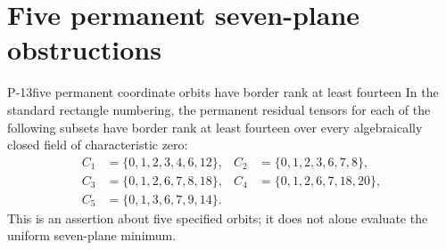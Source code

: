 \section{Five permanent seven-plane obstructions}

\begin{finding}{P-13}{five permanent coordinate orbits have border rank at least fourteen}
In the standard rectangle numbering, the permanent residual tensors
for each of the following subsets have border rank at least fourteen
over every algebraically closed field of characteristic zero:
\[
\begin{aligned}
 C_1&=\{0,1,2,3,4,6,12\},&
 C_2&=\{0,1,2,3,6,7,8\},\\
 C_3&=\{0,1,2,6,7,8,18\},&
 C_4&=\{0,1,2,6,7,18,20\},\\
 C_5&=\{0,1,3,6,7,9,14\}.&&
\end{aligned}
\]
This is an assertion about five specified orbits; it does not alone
evaluate the uniform seven-plane minimum.
\end{finding}

